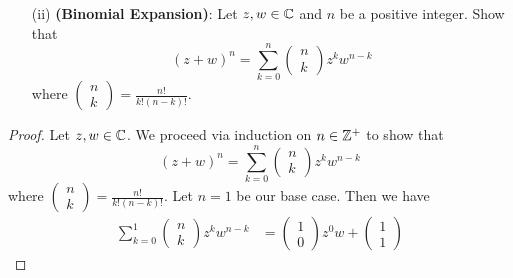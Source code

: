 \documentclass[a4paper]{article}
\begin{document}
\begin{enumerate}
\begin{enumerate}
\begin{proof}
                \end{proof}
            \item[(ii)] \textbf{(Binomial Expansion)}: Let \( z,w \in \mathbb{C}  \) and \( n  \) be a positive integer. Show that 
                \[  (z + w)^{n} = \sum_{ k=  0  }^{  n  } \begin{pmatrix} 
                           n \\
                           k 
                          \end{pmatrix} z^{k} w^{n-k}    \]
                          where \( \begin{pmatrix} 
                                     n \\
                                     k 
                                    \end{pmatrix}  = \frac{ n!  }{ k! (n-k)! }. \)
        \end{enumerate}
        \begin{proof}
        Let \( z,w \in \mathbb{C}  \). We proceed via induction on \( n \in \mathbb{Z}^{+}  \) to show that 
                \[  (z + w)^{n} = \sum_{ k=  0  }^{  n  } \begin{pmatrix} 
                           n \\
                           k 
                          \end{pmatrix} z^{k} w^{n-k}    \]
                          where \( \begin{pmatrix} 
                                     n \\
                                     k 
                                    \end{pmatrix}  = \frac{ n!  }{ k! (n-k)! }. \)
        Let \( n =1  \) be our base case. Then we have  
        \begin{align*}
            \sum_{ k=0  }^{ 1 } \begin{pmatrix} 
                       n \\
                       k 
                      \end{pmatrix} z^{k } w^{n-k} &= \begin{pmatrix} 
                                1 \\ 
                                0 
                                \end{pmatrix} z^{0} w + \begin{pmatrix} 
                                           1 \\
                                           1

\end{pmatrix}
\end{align*}
\end{proof}
\end{enumerate}
\end{document}
